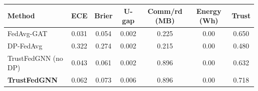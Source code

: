 \begin{tabular}{lcccccc}
\toprule
Method & ECE & Brier & U-gap & Comm/rd (MB) & Energy (Wh) & Trust \\
\midrule
FedAvg-GAT & 0.031 & 0.054 & 0.002 & 0.225 & 0.00 & 0.650 \\
DP-FedAvg & 0.322 & 0.274 & 0.002 & 0.215 & 0.00 & 0.480 \\
TrustFedGNN (no DP) & 0.043 & 0.061 & 0.002 & 0.896 & 0.00 & 0.632 \\
\textbf{TrustFedGNN} & 0.062 & 0.073 & 0.006 & 0.896 & 0.00 & 0.718 \\
\bottomrule
\end{tabular}